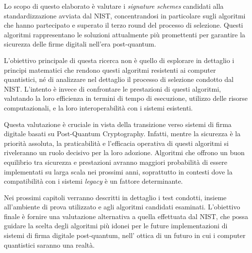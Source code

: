 Lo scopo di questo elaborato è valutare i \textit{signature schemes} candidati alla standardizzazione avviata dal NIST, concentrandosi in particolare sugli algoritmi che hanno partecipato e superato il terzo round del processo di selezione. Questi algoritmi rappresentano le soluzioni attualmente più promettenti per garantire la sicurezza delle firme digitali nell'era post-quantum.

L'obiettivo principale di questa ricerca non è quello di esplorare in dettaglio i principi matematici che rendono questi algoritmi resistenti ai computer quantistici, né di analizzare nel dettaglio il processo di selezione condotto dal NIST. L'intento è invece di confrontare le prestazioni di questi algoritmi, valutando la loro efficienza in termini di tempo di esecuzione, utilizzo delle risorse computazionali, e la loro interoperabilità con i sistemi esistenti.

Questa valutazione è cruciale in vista della transizione verso sistemi di firma digitale basati su Post-Quantum Cryptography. Infatti, mentre la sicurezza è la priorità assoluta, la praticabilità e l'efficacia operativa di questi algoritmi si riveleranno un ruolo decisivo per la loro adozione. Algoritmi che offrono un buon equilibrio tra sicurezza e prestazioni avranno maggiori probabilità di essere implementati su larga scala nei prossimi anni, soprattutto in contesti dove la compatibilità con i sistemi \textit{legacy} è un fattore determinante.

Nei prossimi capitoli verranno descritti in dettaglio i test condotti, insieme all'ambiente di prova utilizzato e agli algoritmi candidati esaminati. L'obiettivo finale è fornire una valutazione alternativa a quella effettuata dal NIST, che possa guidare la scelta degli algoritmi più idonei per le future implementazioni di sistemi di firma digitale post-quantum, nell' ottica di un futuro in cui i computer quantistici saranno una realtà.